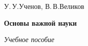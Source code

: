 \documentclass[14pt, twoside, a4paper]{extbook}
\begin{document}
{
\pagestyle{plain}
\vspace*{\fill}
\centering
\large
У.\,У.\;Ученов, В.\,В.\;Великов

\LARGE
\textbf{Основы важной науки}

\large
\textit{Учебное пособие}
\vspace*{\fill}
\clearpage
}
\tableofcontents










\end{document}
